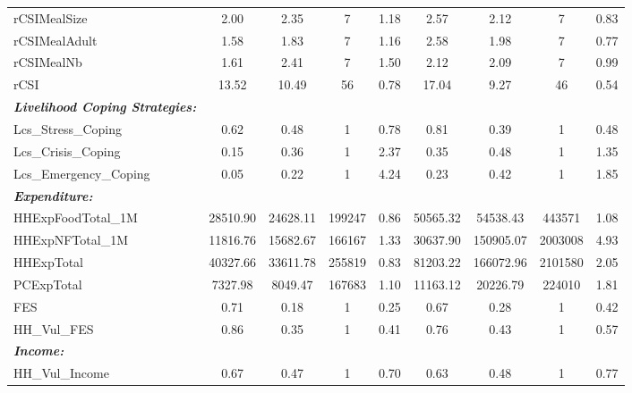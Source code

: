 {\begin{tabular}{l*{2}{cccc}}
rCSIMealSize&        2.00&        2.35&           7&        1.18&        2.57&        2.12&           7&        0.83\\
rCSIMealAdult&        1.58&        1.83&           7&        1.16&        2.58&        1.98&           7&        0.77\\
rCSIMealNb  &        1.61&        2.41&           7&        1.50&        2.12&        2.09&           7&        0.99\\
rCSI        &       13.52&       10.49&          56&        0.78&       17.04&        9.27&          46&        0.54\\
  \textbf{\textit{Livelihood Coping Strategies:}}&            &            &            &            &            &            &            &            \\
Lcs\_Stress\_Coping&        0.62&        0.48&           1&        0.78&        0.81&        0.39&           1&        0.48\\
Lcs\_Crisis\_Coping&        0.15&        0.36&           1&        2.37&        0.35&        0.48&           1&        1.35\\
Lcs\_Emergency\_Coping&        0.05&        0.22&           1&        4.24&        0.23&        0.42&           1&        1.85\\
  \textbf{\textit{Expenditure:}}&            &            &            &            &            &            &            &            \\
HHExpFoodTotal\_1M&    28510.90&    24628.11&      199247&        0.86&    50565.32&    54538.43&      443571&        1.08\\
HHExpNFTotal\_1M&    11816.76&    15682.67&      166167&        1.33&    30637.90&   150905.07&     2003008&        4.93\\
HHExpTotal  &    40327.66&    33611.78&      255819&        0.83&    81203.22&   166072.96&     2101580&        2.05\\
PCExpTotal  &     7327.98&     8049.47&      167683&        1.10&    11163.12&    20226.79&      224010&        1.81\\
FES         &        0.71&        0.18&           1&        0.25&        0.67&        0.28&           1&        0.42\\
HH\_Vul\_FES  &        0.86&        0.35&           1&        0.41&        0.76&        0.43&           1&        0.57\\
      \textbf{\textit{Income:}}&            &            &            &            &            &            &            &            \\
HH\_Vul\_Income&        0.67&        0.47&           1&        0.70&        0.63&        0.48&           1&        0.77\\
\hline\hline
\end{tabular}
}
